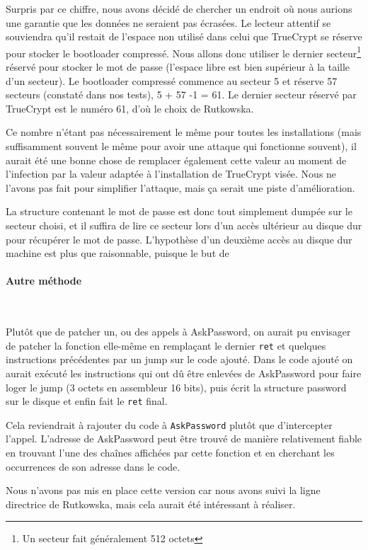 \documentclass[12pt,a4paper]{article}
\begin{document}
Surpris par ce chiffre, nous avons décidé de chercher un endroit où nous aurions
une garantie que les données ne seraient pas écrasées. Le lecteur attentif se
souviendra qu'il restait de l'espace non utilisé dans celui que TrueCrypt se 
réserve pour stocker le bootloader compressé. Nous allons donc utiliser le dernier
secteur\footnote{Un secteur fait généralement 512 octets} réservé pour stocker
le mot de passe (l'espace libre est bien supérieur à la taille d'un secteur).
Le bootloader compressé commence au secteur 5 et réserve 57 secteurs (constaté
dans nos tests), 5 + 57 -1 = 61. Le dernier secteur réservé par TrueCrypt est le
numéro 61, d'où le choix de Rutkowska.

Ce nombre n'étant pas nécessairement le même pour toutes les installations (mais
suffisamment souvent le même pour avoir une attaque qui fonctionne souvent), il
aurait été une bonne chose de remplacer également cette valeur au moment de
l'infection par la valeur adaptée à l'installation de TrueCrypt visée. Nous ne
l'avons pas fait pour simplifier l'attaque, mais ça serait une piste
d'amélioration.

La structure contenant le mot de passe est donc tout simplement dumpée sur le
secteur choisi, et il suffira de lire ce secteur lors d'un accès ultérieur au
disque dur pour récupérer le mot de passe. L'hypothèse d'un deuxième accès au
disque dur machine est plus que raisonnable, puisque le but de

\paragraph{Autre méthode}~

Plutôt que de patcher un, ou des appels à AskPassword, on aurait pu envisager
de patcher la fonction elle-même en remplaçant le dernier \texttt{ret} et 
quelques instructions précédentes par un jump sur le code ajouté. Dans le code
ajouté on aurait exécuté les instructions qui ont dû être enlevées de AskPassword
pour faire loger le jump (3 octets en assembleur 16 bits), puis écrit la structure
password sur le disque et enfin fait le \texttt{ret} final.

Cela reviendrait à rajouter du code à \texttt{AskPassword} plutôt que
d'intercepter l'appel. L'adresse de AskPassword peut être trouvé de manière
relativement fiable en trouvant l'une des chaînes affichées par cette fonction
et en cherchant les occurrences de son adresse dans le code.

Nous n'avons pas mis en place cette version car nous avons suivi la ligne
directrice de Rutkowska, mais cela aurait été intéressant à réaliser.
\end{document}
